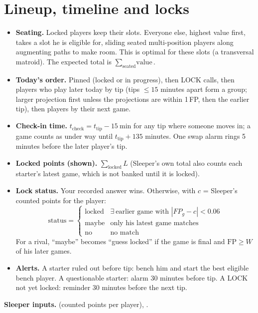 \documentclass[10pt]{article}
\newcommand{\api}[1]{\texttt{\detokenize{#1}}}
\newcommand{\sleeper}[1]{\par\textbf{Sleeper inputs.} #1}
\begin{document}
\section{Lineup, timeline and locks}
\begin{itemize}
\item \textbf{Seating.} Locked players keep their slots. Everyone else, highest value first, takes a slot he is eligible
for, sliding seated multi-position players along augmenting paths to make room. This is optimal for these slots (a
transversal matroid). The expected total is $\sum_{\text{seated}}\text{value}$.
\item \textbf{Today's order.} Pinned (locked or in progress), then LOCK calls, then players who play later today by tip
(tips $\le 15$ minutes apart form a group; larger projection first unless the projections are within 1\,FP, then the
earlier tip), then players by their next game.
\item \textbf{Check-in time.} $t_{\text{check}} = t_{\text{tip}} - 15\ \text{min}$ for any tip where someone moves in;
a game counts as under way until $t_{\text{tip}}+135$ minutes. One swap alarm rings 5 minutes before the later player's tip.
\item \textbf{Locked points (shown).} $\sum_{\text{locked}} L$ (Sleeper's own total also counts each starter's latest
game, which is not banked until it is locked).
\item \textbf{Lock status.} Your recorded answer wins. Otherwise, with $c$ = Sleeper's counted points for the player:
\[
\text{status}=\begin{cases}\text{locked}& \exists\ \text{earlier game with }|FP_g-c|<0.06\\
\text{maybe}& \text{only his latest game matches}\\ \text{no}&\text{no match}\end{cases}
\]
For a rival, ``maybe'' becomes ``guess locked'' if the game is final and $\mathrm{FP}\ge W$ of his later games.
\item \textbf{Alerts.} A starter ruled out before tip: bench him and start the best eligible bench player. A questionable
starter: alarm 30 minutes before tip. A LOCK not yet locked: reminder 30 minutes before the next tip.
\end{itemize}
\sleeper{\api{players_points} (counted points per player), \api{starters}.}
\end{document}
